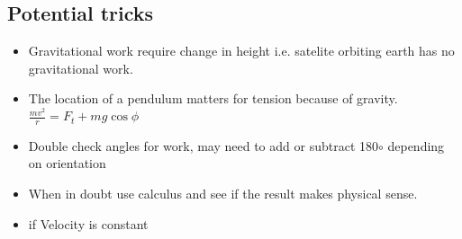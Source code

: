 \documentclass{article}
\begin{document}
\begin{multicols}{2}
\subsection*{Potential tricks}
\begin{itemize}
	\item Gravitational work require change in height i.e. satelite orbiting earth has no gravitational work.
	\item The location of a pendulum matters for tension because of gravity. $\frac{mv^2}{r} = F_t + mg\cos \phi$
	\item Double check angles for work, may need to add or subtract 180$\circ$ depending on orientation
	\item When in doubt use calculus and see if the result makes physical sense.
	\item if Velocity is constant
\end{itemize}

\end{multicols}
\end{document}
